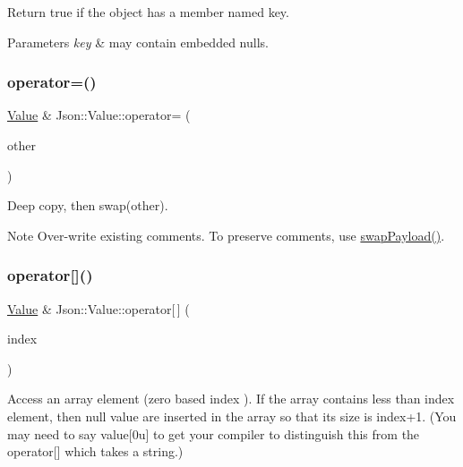 Return true if the object has a member named key. 
\begin{DoxyParams}{Parameters}
{\em key} & may contain embedded nulls. \\
\hline
\end{DoxyParams}
\mbox{\label{classJson_1_1Value_a795acb28772da4c5d85ae8f4af36c69f}} 
\subsubsection{\texorpdfstring{operator=()}{operator=()}}
{\footnotesize\ttfamily \hyperlink{classJson_1_1Value}{Value} \& Json\+::\+Value\+::operator= (\begin{DoxyParamCaption}\item[{\hyperlink{classJson_1_1Value}{Value}}]{other }\end{DoxyParamCaption})}

Deep copy, then swap(other). \begin{DoxyNote}{Note}
Over-\/write existing comments. To preserve comments, use \hyperlink{classJson_1_1Value_a5263476047f20e2fc6de470e4de34fe5}{swap\+Payload()}. 
\end{DoxyNote}
\mbox{\label{classJson_1_1Value_a7d99f5dba388cdaa152ce6ef933d64ef}} 
\subsubsection{\texorpdfstring{operator[]()}{operator[]()}\hspace{0.1cm}{\footnotesize\ttfamily [1/9]}}
{\footnotesize\ttfamily \hyperlink{classJson_1_1Value}{Value} \& Json\+::\+Value\+::operator\mbox{[}$\,$\mbox{]} (\begin{DoxyParamCaption}\item[{Array\+Index}]{index }\end{DoxyParamCaption})}

Access an array element (zero based index ). If the array contains less than index element, then null value are inserted in the array so that its size is index+1. (You may need to say \textquotesingle{}value\mbox{[}0u\mbox{]}\textquotesingle{} to get your compiler to distinguish this from the operator\mbox{[}\mbox{]} which takes a string.) \mbox{\label{classJson_1_1Value_ac9182982c361e0ab621134d406e5f250}} 

